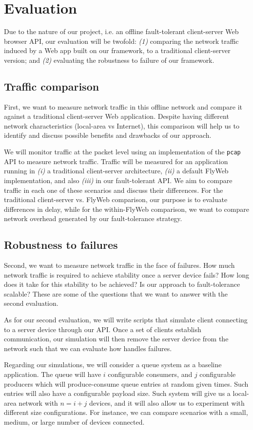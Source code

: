 \section{Evaluation}
\label{sec:evaluation}

Due to the nature of our project, i.e. an offline fault-tolerant client-server Web browser API, our evaluation will be twofold: \textit{(1)} comparing the network traffic induced by a Web app built on our framework, to a traditional client-server version; and \textit{(2)} evaluating the robustness to failure of our framework.

\subsection{Traffic comparison}

First, we want to measure network traffic in this offline network and compare it against a traditional client-server Web application. 
Despite having different network characteristics (local-area vs Internet), this comparison will help us to identify and discuss possible benefits and drawbacks of our approach.

We will monitor traffic at the packet level using an implementation of the \texttt{pcap} API to measure network traffic.
Traffic will be measured for an application running in {\it (i)} a traditional client-server architecture, {\it (ii)} a default FlyWeb implementation, and also {\it (iii)} in our fault-tolerant API. 
We aim to compare traffic in each one of these scenarios and discuss their differences. 
For the traditional client-server vs. FlyWeb comparison, our purpose is to evaluate differences in delay, while for the within-FlyWeb comparison, we want to compare network overhead generated by our fault-tolerance strategy. 

\subsection{Robustness to failures}

Second, we want to measure network traffic in the face of failures.
How much network traffic is required to achieve stability once a server device fails? 
How long does it take for this stability to be achieved?
Is our approach to fault-tolerance scalable? 
These are some of the questions that we want to answer with the second evaluation.

As for our second evaluation, we will write scripts that simulate client connecting to a server device through our \texttt{\APIName} API. 
Once a set of clients establish communication, our simulation will then remove the server device from the network such that we can evaluate how \texttt{\APIName} handles failures. 

Regarding our simulations, we will consider a queue system as a baseline application.
The queue will have $i$ configurable consumers, and $j$ configurable producers which will produce-consume queue entries at random given times. 
Such entries will also have a configurable payload size. 
Such system will give us a local-area network with $n = i + j$ devices, and it will also allow us to experiment with different size configurations. 
For instance, we can compare scenarios with a small, medium, or large number of devices connected.

